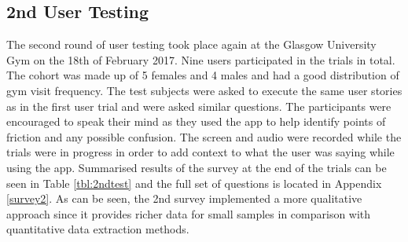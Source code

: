 \documentclass{l4proj}
\begin{document}
\subsection{2nd User Testing}
The second round of user testing took place again at the Glasgow University Gym on the 18th of February 2017. Nine users participated in the trials in total. The cohort was made up of 5 females and 4 males and had a good distribution of gym visit frequency. The test subjects were asked to execute the same user stories as in the first user trial and were asked similar questions. The participants were encouraged to speak their mind as they used the app to help identify points of friction and any possible confusion. The screen and audio were recorded while the trials were in progress in order to add context to what the user was saying while using the app. Summarised results of the survey at the end of the trials can be seen in Table \ref{tbl:2ndtest} and the full set of questions is located in Appendix \ref{survey2}. As can be seen, the 2nd survey implemented a more qualitative approach since it provides richer data for small samples in comparison with quantitative data extraction methods. 
\end{document}
